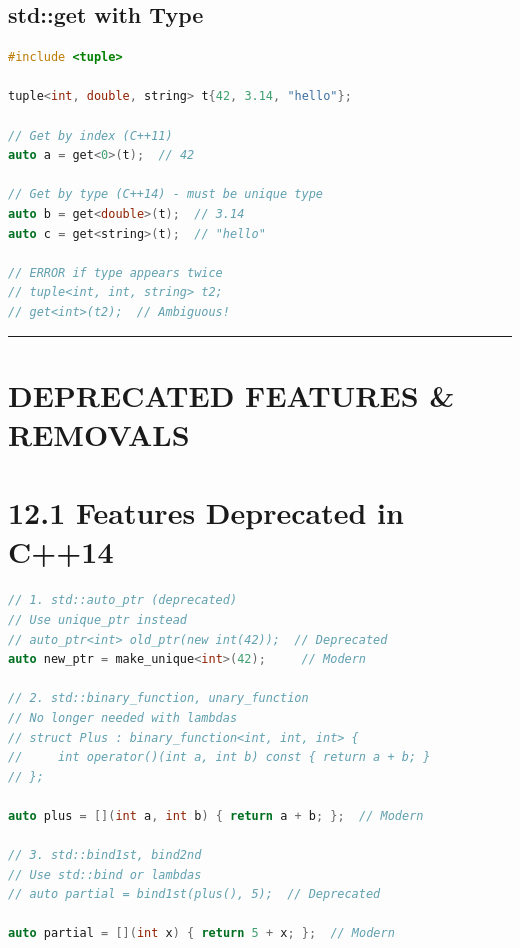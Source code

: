 \hypertarget{stdget-with-type}{%
\subsection{std::get with Type}\label{stdget-with-type}}

\begin{lstlisting}[language={C++}]
#include <tuple>

tuple<int, double, string> t{42, 3.14, "hello"};

// Get by index (C++11)
auto a = get<0>(t);  // 42

// Get by type (C++14) - must be unique type
auto b = get<double>(t);  // 3.14
auto c = get<string>(t);  // "hello"

// ERROR if type appears twice
// tuple<int, int, string> t2;
// get<int>(t2);  // Ambiguous!
\end{lstlisting}

\begin{center}\rule{0.5\linewidth}{0.5pt}\end{center}

\hypertarget{deprecated-features-removals}{%
\section{DEPRECATED FEATURES \&
REMOVALS}\label{deprecated-features-removals}}

\hypertarget{features-deprecated-in-c14}{%
\section{12.1 Features Deprecated in
C++14}\label{features-deprecated-in-c14}}

\begin{lstlisting}[language={C++}]
// 1. std::auto_ptr (deprecated)
// Use unique_ptr instead
// auto_ptr<int> old_ptr(new int(42));  // Deprecated
auto new_ptr = make_unique<int>(42);     // Modern

// 2. std::binary_function, unary_function
// No longer needed with lambdas
// struct Plus : binary_function<int, int, int> {
//     int operator()(int a, int b) const { return a + b; }
// };

auto plus = [](int a, int b) { return a + b; };  // Modern

// 3. std::bind1st, bind2nd
// Use std::bind or lambdas
// auto partial = bind1st(plus(), 5);  // Deprecated

auto partial = [](int x) { return 5 + x; };  // Modern
\end{lstlisting}

